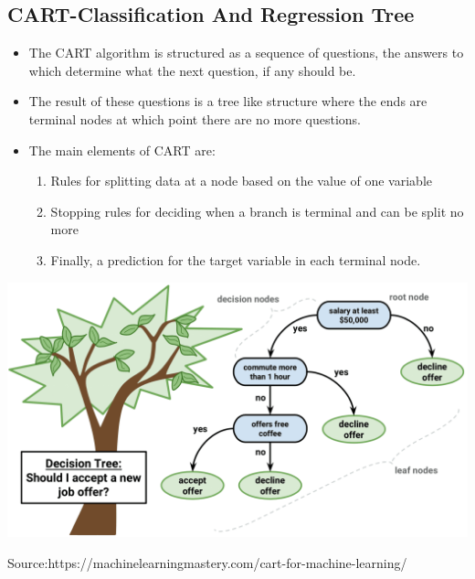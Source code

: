 \documentclass[a0,portrait]{a0poster}
\begin{document}
\begin{multicols}{3}
\subsection*{CART-Classification And Regression Tree}
\begin{itemize}
\item The CART algorithm is structured as a sequence of questions, the answers to which determine what the next question, if any should be.
\item The result of these questions is a tree like structure where the ends are terminal nodes at which point there are no more questions.
\item The main elements of CART are:
\begin{enumerate}
    \item Rules for splitting data at a node based on the value of one variable
    \item Stopping rules for deciding when a branch is terminal and can be split no more
    \item Finally, a prediction for the target variable in each terminal node.
\end{enumerate}
\end{itemize}
\begin{center}\vspace{1cm}
\includegraphics[width=0.8\linewidth]{exampletree.png}
\caption*{Source:https://machinelearningmastery.com/cart-for-machine-learning/}
\end{center}\vspace{1cm}


\end{multicols}
\end{document}
